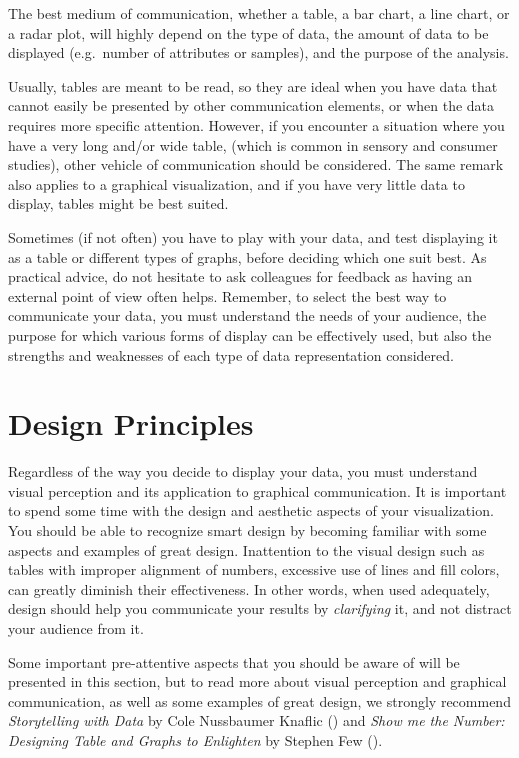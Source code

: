 \documentclass[
]{krantz}
\begin{document}
The best medium of communication, whether a table, a bar chart, a line chart, or a radar plot, will highly depend on the type of data, the amount of data to be displayed (e.g.~number of attributes or samples), and the purpose of the analysis.

Usually, tables are meant to be read, so they are ideal when you have data that cannot easily be presented by other communication elements, or when the data requires more specific attention. However, if you encounter a situation where you have a very long and/or wide table, (which is common in sensory and consumer studies), other vehicle of communication should be considered. The same remark also applies to a graphical visualization, and if you have very little data to display, tables might be best suited.

Sometimes (if not often) you have to play with your data, and test displaying it as a table or different types of graphs, before deciding which one suit best. As practical advice, do not hesitate to ask colleagues for feedback as having an external point of view often helps. Remember, to select the best way to communicate your data, you must understand the needs of your audience, the purpose for which various forms of display can be effectively used, but also the strengths and weaknesses of each type of data representation considered.

\hypertarget{design-principles}{%
\section{Design Principles}\label{design-principles}}

Regardless of the way you decide to display your data, you must understand visual perception and its application to graphical communication. It is important to spend some time with the design and aesthetic aspects of your visualization. You should be able to recognize smart design by becoming familiar with some aspects and examples of great design. Inattention to the visual design such as tables with improper alignment of numbers, excessive use of lines and fill colors, can greatly diminish their effectiveness. In other words, when used adequately, design should help you communicate your results by \emph{clarifying} it, and not distract your audience from it.

Some important pre-attentive aspects that you should be aware of will be presented in this section, but to read more about visual perception and graphical communication, as well as some examples of great design, we strongly recommend \emph{Storytelling with Data} by Cole Nussbaumer Knaflic (\citet{Knaflic2015}) and \emph{Show me the Number: Designing Table and Graphs to Enlighten} by Stephen Few (\citet{Few2012}).
\end{document}
